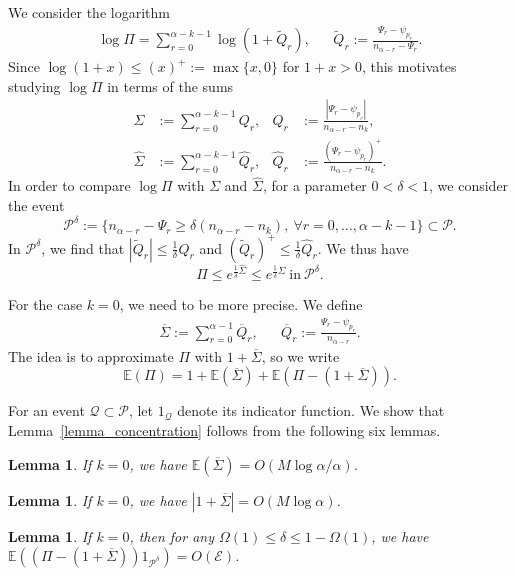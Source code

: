 \documentclass{article}
\theoremstyle{plain}
\theoremstyle{remark}
\theoremstyle{plain}
\newtheorem{lemma}[theorem]{Lemma}
\numberwithin{equation}{section}
\begin{document}
	We consider the logarithm
	\begin{align}
		\log\Pi=\sum_{r=0}^{\alpha-k-1}\log(1+\widetilde{Q}_r),&&\widetilde{Q}_r:=\frac{\Psi_r-\psi_{p_r}}{n_{\alpha-r}-\Psi_r}.
	\end{align}
	Since $\log(1+x)\leq(x)^+:=\max\{x,0\}$ for $1+x>0$, this motivates studying $\log\Pi$ in terms of the sums
	\begin{align}
		\Sigma&:=\sum_{r=0}^{\alpha-k-1}Q_r,&Q_r&:=\frac{|\Psi_r-\psi_{p_r}|}{n_{\alpha-r}-n_k},
		\\\hat{\Sigma}&:=\sum_{r=0}^{\alpha-k-1}\hat{Q}_r,&\hat{Q}_r&:=\frac{(\Psi_r-\psi_{p_r})^+}{n_{\alpha-r}-n_k}.
	\end{align}
	In order to compare $\log\Pi$ with $\Sigma$ and $\hat{\Sigma}$, for a parameter $0<\delta<1$, we consider the event $$\mathcal{P}^{\delta}:=\{n_{\alpha-r}-\Psi_r\geq\delta(n_{\alpha-r}-n_k),\ \forall r=0,\ldots,\alpha-k-1\}\subset\mathcal{P}.$$ In $\mathcal{P}^{\delta}$, we find that $|\widetilde{Q}_r|\leq\frac1{\delta}Q_r$ and $(\widetilde{Q}_r)^+\leq\frac1{\delta}\hat{Q}_r$. We thus have
	\begin{equation}\label{equation_pdelta}
		\Pi\leq e^{\frac1{\delta}\hat{\Sigma}}\leq e^{\frac1{\delta}\Sigma}\ \text{in}\ \mathcal{P}^{\delta}.
	\end{equation}
	
	For the case $k=0$, we need to be more precise. We define
	\begin{align}
		\overline{\Sigma}:=\sum_{r=0}^{\alpha-1}\overline{Q}_r,&&\overline{Q}_r:=\frac{\Psi_r-\psi_{p_r}}{n_{\alpha-r}}.
	\end{align}
	The idea is to approximate $\Pi$ with $1+\overline{\Sigma}$, so we write $$\mathbb{E}(\Pi)=1+\mathbb{E}(\overline{\Sigma})+\mathbb{E}(\Pi-(1+\overline{\Sigma})).$$
	
	For an event $\mathcal{Q}\subset\mathcal{P}$, let $1_{\mathcal{Q}}$ denote its indicator function. We show that Lemma~\ref{lemma_concentration} follows from the following six lemmas.
	
	\begin{lemma}\label{lemma_bar_e}
		If $k=0$, we have $\mathbb{E}(\overline{\Sigma})=O(M\log\alpha/\alpha)$.
	\end{lemma}
	
	\begin{lemma}\label{lemma_bar_bound}
		If $k=0$, we have $|1+\overline{\Sigma}|=O(M\log\alpha)$.
	\end{lemma}
	
	\begin{lemma}\label{lemma_delta}
		If $k=0$, then for any $\Omega(1)\leq\delta\leq1-\Omega(1)$, we have $\mathbb{E}((\Pi-(1+\overline{\Sigma}))1_{\mathcal{P}^{\delta}})=O(\mathscr{E})$.
	\end{lemma}
	
\end{document}
